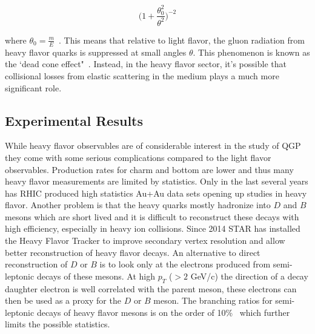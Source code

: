 \begin{equation}\label{eq:deadcone}
\Big( 1 + \frac{\theta^2_0}{\theta^2} \Big)^{-2}
\end{equation}

where $ \theta_0 = \frac{m}{E}$~\cite{glurad}. This means that relative to light flavor, the gluon radiation from heavy flavor quarks is suppressed at small angles $\theta$. This phenomenon is known as the `dead cone effect"~\cite{hqcolor}. Instead, in the heavy flavor sector, it's possible that collisional losses from elastic scattering in the medium plays a much more significant role.

\subsection{Experimental Results}

While heavy flavor observables are of considerable interest in the study of QGP they come with some serious complications compared to the light flavor observables. Production rates for charm and bottom are lower and thus many heavy flavor measurements are limited by statistics. Only in the last several years has RHIC produced high statistics Au+Au data sets opening up studies in heavy flavor. Another problem is that the heavy quarks mostly hadronize into $D$ and $B$ mesons which are short lived and it is difficult to reconstruct these decays with high efficiency, especially in heavy ion collisions. Since 2014 STAR has installed the Heavy Flavor Tracker to improve secondary vertex resolution and allow better reconstruction of heavy flavor decays. An alternative to direct reconstruction of $D$ or $B$ is to look only at the electrons produced from semi-leptonic decays of these mesons. At high $p_T$ ($> 2$ GeV/c) the direction of a decay daughter electron is well correlated with the parent meson, these electrons can then be used as a proxy for the $D$ or $B$ meson. The branching ratios for semi-leptonic decays of heavy flavor mesons is on the order of 10\%~\cite{pdg} which further limits the possible statistics.

